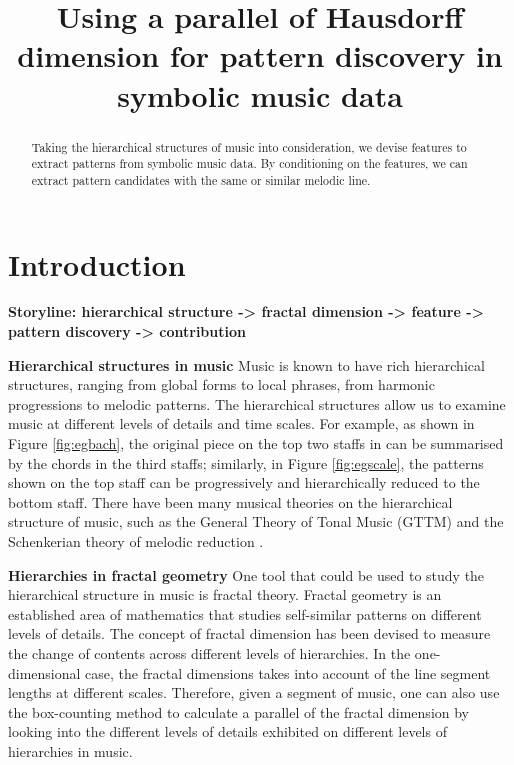 \documentclass{article}
\title{Using a parallel of Hausdorff dimension for pattern discovery in symbolic music data}
\begin{document}
%
\maketitle
%
\begin{abstract}
Taking the hierarchical structures of music into consideration, we devise features to extract patterns from symbolic music data. By conditioning on the features, we can extract pattern candidates with the same or similar melodic line. 
\end{abstract}

\section{Introduction}
\label{sec:intro}

\textbf{Storyline: hierarchical structure -> fractal dimension -> feature -> pattern discovery -> contribution }

\textbf{Hierarchical structures in music}
Music is known to have rich hierarchical structures, ranging from global forms to local phrases, from harmonic progressions to melodic patterns. 
The hierarchical structures allow us to examine music at different levels of details and time scales. For example, as shown in Figure \ref{fig:egbach}, the original piece on the top two staffs in can be summarised by the chords in the third staffs; similarly, in Figure \ref{fig:egscale}, the patterns shown on the top staff can be progressively and hierarchically reduced to the bottom staff. 
There have been many musical theories on the hierarchical structure of music, such as the General Theory of Tonal Music (GTTM) \cite{lerdahl1985generative} and the Schenkerian theory of melodic reduction \cite{forte1959schenker}.

\textbf{Hierarchies in fractal geometry}
One tool that could be used to study the hierarchical structure in music is fractal theory.
Fractal geometry is an established area of mathematics that studies self-similar patterns on different levels of details.
The concept of fractal dimension has been devised to measure the change of contents across different levels of hierarchies.
In the one-dimensional case, the fractal dimensions takes into account of the line segment lengths at different scales.
Therefore, given a segment of music, one can also use the box-counting method to calculate a parallel of the fractal dimension by looking into the different levels of details exhibited on different levels of hierarchies in music.
\end{document}
